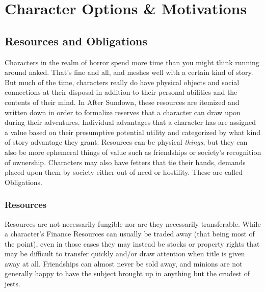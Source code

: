 \chapter{Character Options \& Motivations} \label{chapter:Character Options and Motivations}

\section{Resources and Obligations}

Characters in the realm of horror spend more time than you might think running around naked. That's fine and all, and meshes well with a certain kind of story. But much of the time, characters really do have physical objects and social connections at their disposal in addition to their personal abilities and the contents of their mind. In After Sundown, these resources are itemized and written down in order to formalize reserves that a character can draw upon during their adventures. Individual advantages that a character has are assigned a value based on their presumptive potential utility and categorized by what kind of story advantage they grant. Resources can be physical \textit{things}, but they can also be more ephemeral things of value such as friendships or society's recognition of ownership. Characters may also have fetters that tie their hands, demands placed upon them by society either out of need or hostility. These are called Obligations.

\subsection{Resources}

Resources are not necessarily fungible nor are they necessarily transferable. While a character's Finance Resources can usually be traded away (that being most of the point), even in those cases they may instead be stocks or property rights that may be difficult to transfer quickly and/or draw attention when title is given away at all. Friendships can almost never be sold away, and minions are not generally happy to have the subject brought up in anything but the crudest of jests.


